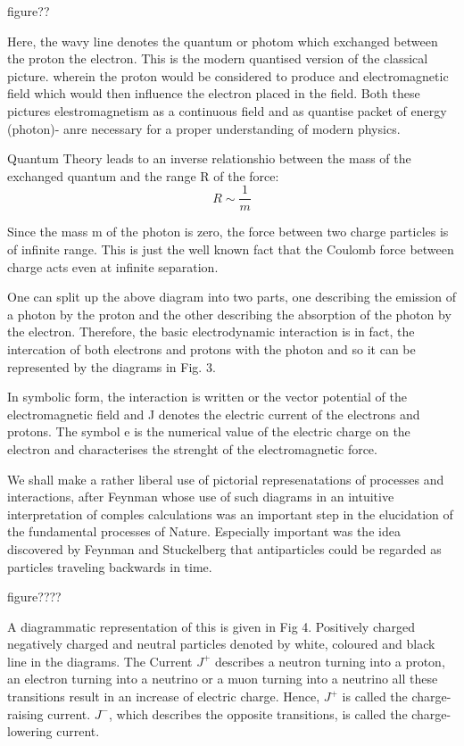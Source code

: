 figure??


Here, the wavy line denotes the quantum or photom which exchanged between the proton the electron. This is the modern quantised version of the classical picture. wherein the proton would be considered to produce and electromagnetic field which would then influence the electron placed in the field. Both these pictures elestromagnetism as a continuous field and as quantise packet of energy (photon)- anre necessary for a proper understanding of modern physics.

Quantum Theory leads to an inverse relationshio between the mass of the exchanged quantum and the range R of the force:
$$
R \sim \frac{1}{m}
$$

Since the mass m of the photon is zero, the force between two charge particles is of infinite range. This is just the well known fact that the Coulomb force between charge acts even at infinite separation.

One can split up the above diagram into two parts, one describing the emission of a photon by the proton and the other describing the absorption of the photon by the electron. Therefore, the basic electrodynamic interaction is in fact, the intercation of both electrons and protons with the photon and so it can be represented by the diagrams in Fig. 3.

In symbolic form, the interaction is written or the vector potential of the electromagnetic field and J denotes the electric current of the electrons and protons. The symbol e is the numerical value of the electric charge on the electron and characterises the strenght of the electromagnetic force.

We shall make a rather liberal use of pictorial represenatations of processes and interactions, after Feynman whose use of such diagrams in an intuitive interpretation of comples calculations was an important step in the elucidation of the fundamental processes of Nature. Especially important was the idea discovered by Feynman and Stuckelberg that antiparticles could be regarded as particles traveling backwards in time.

figure????

A diagrammatic representation of this is given in Fig 4. Positively charged negatively charged and neutral particles denoted by white, colou\-red and black line in the diagrams. The Current $J^{+}$ describes a neutron turning into a proton, an electron turning into a neutrino or a muon turning into a neutrino all these transitions result in an increase of electric charge. Hence, $J^{+}$ is called the charge-raising current. $J^{-}$, which describes the opposite transitions, is called the charge-lowering current.

